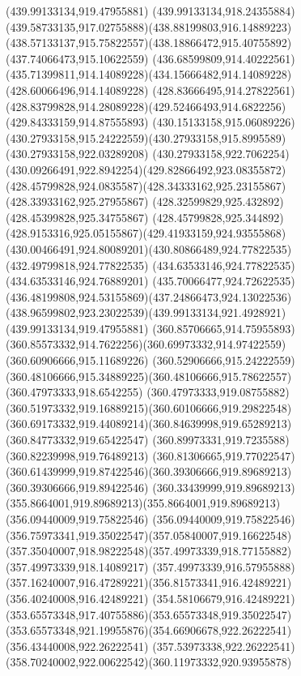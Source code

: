 {{		\moveto(439.99133134,919.47955881)
		\curveto(439.99133134,918.24355884)(439.58733135,917.02755888)(438.88199803,916.14889223)
		\curveto(438.57133137,915.75822557)(438.18866472,915.40755892)(437.74066473,915.10622559)
		\curveto(436.68599809,914.40222561)(435.71399811,914.14089228)(434.15666482,914.14089228)
		\lineto(428.60066496,914.14089228)
		\lineto(428.83666495,914.27822561)
		\curveto(428.83799828,914.28089228)(429.52466493,914.6822256)(429.84333159,914.87555893)
		\curveto(430.15133158,915.06089226)(430.27933158,915.24222559)(430.27933158,915.8995589)
		\lineto(430.27933158,922.03289208)
		\curveto(430.27933158,922.7062254)(430.09266491,922.8942254)(429.82866492,923.08355872)
		\curveto(428.45799828,924.0835587)(428.34333162,925.23155867)(428.33933162,925.27955867)
		\lineto(428.32599829,925.432892)
		\lineto(428.45399828,925.34755867)
		\curveto(428.45799828,925.344892)(428.9153316,925.05155867)(429.41933159,924.93555868)
		\curveto(430.00466491,924.80089201)(430.80866489,924.77822535)(432.49799818,924.77822535)
		\lineto(434.63533146,924.77822535)
		\lineto(434.63533146,924.76889201)
		\curveto(435.70066477,924.72622535)(436.48199808,924.53155869)(437.24866473,924.13022536)
		\curveto(438.96599802,923.23022539)(439.99133134,921.4928921)(439.99133134,919.47955881)
		\moveto(360.85706665,914.75955893)
		\curveto(360.85573332,914.7622256)(360.69973332,914.97422559)(360.60906666,915.11689226)
		\curveto(360.52906666,915.24222559)(360.48106666,915.34889225)(360.48106666,915.78622557)
		\lineto(360.47973333,918.6542255)
		\curveto(360.47973333,919.08755882)(360.51973332,919.16889215)(360.60106666,919.29822548)
		\curveto(360.69173332,919.44089214)(360.84639998,919.65289213)(360.84773332,919.65422547)
		\lineto(360.89973331,919.7235588)
		\lineto(360.82239998,919.76489213)
		\curveto(360.81306665,919.77022547)(360.61439999,919.87422546)(360.39306666,919.89689213)
		\lineto(360.39306666,919.89422546)
		\curveto(360.33439999,919.89689213)(355.8664001,919.89689213)(355.8664001,919.89689213)
		\lineto(356.09440009,919.75822546)
		\curveto(356.09440009,919.75822546)(356.75973341,919.35022547)(357.05840007,919.16622548)
		\curveto(357.35040007,918.98222548)(357.49973339,918.77155882)(357.49973339,918.14089217)
		\lineto(357.49973339,916.57955888)
		\curveto(357.16240007,916.47289221)(356.81573341,916.42489221)(356.40240008,916.42489221)
		\curveto(354.58106679,916.42489221)(353.65573348,917.40755886)(353.65573348,919.35022547)
		\curveto(353.65573348,921.19955876)(354.66906678,922.26222541)(356.43440008,922.26222541)
		\curveto(357.53973338,922.26222541)(358.70240002,922.00622542)(360.11973332,920.93955878)
}}
